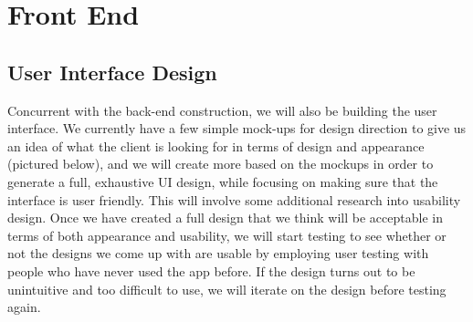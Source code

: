 \documentclass[draftclsnofoot, onecolumn,journal,letterpaper,10pt, compsoc]{IEEEtran}
\begin{document}
\section{Front End}

\subsection{User Interface Design}
Concurrent with the back-end construction, we will also be building the user interface. We currently have a few simple mock-ups for design direction to give us an idea of what the client is looking for in terms of design and appearance (pictured below), and we will create more based on the mockups in order to generate a full, exhaustive UI design, while focusing on making sure that the interface is user friendly. This will involve some additional research into usability design. Once we have created a full design that we think will be acceptable in terms of both appearance and usability, we will start testing to see whether or not the designs we come up with are usable by employing user testing with people who have never used the app before. If the design turns out to be unintuitive and too difficult to use, we will iterate on the design before testing again.
\end{document}

